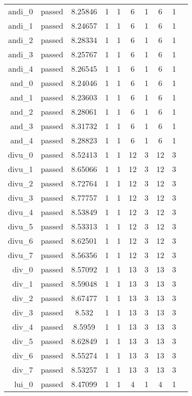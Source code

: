 \begin{longtable}{r|ccccccccc}
    andi\_0 & passed & 8.25846 & 1 & 1 & 6 & 1 & 6 & 1 \\
    andi\_1 & passed & 8.24657 & 1 & 1 & 6 & 1 & 6 & 1 \\
    andi\_2 & passed & 8.28334 & 1 & 1 & 6 & 1 & 6 & 1 \\
    andi\_3 & passed & 8.25767 & 1 & 1 & 6 & 1 & 6 & 1 \\
    andi\_4 & passed & 8.26545 & 1 & 1 & 6 & 1 & 6 & 1 \\
    and\_0 & passed & 8.24046 & 1 & 1 & 6 & 1 & 6 & 1 \\
    and\_1 & passed & 8.23603 & 1 & 1 & 6 & 1 & 6 & 1 \\
    and\_2 & passed & 8.28061 & 1 & 1 & 6 & 1 & 6 & 1 \\
    and\_3 & passed & 8.31732 & 1 & 1 & 6 & 1 & 6 & 1 \\
    and\_4 & passed & 8.28823 & 1 & 1 & 6 & 1 & 6 & 1 \\
    divu\_0 & passed & 8.52413 & 1 & 1 & 12 & 3 & 12 & 3 \\
    divu\_1 & passed & 8.65066 & 1 & 1 & 12 & 3 & 12 & 3 \\
    divu\_2 & passed & 8.72764 & 1 & 1 & 12 & 3 & 12 & 3 \\
    divu\_3 & passed & 8.77757 & 1 & 1 & 12 & 3 & 12 & 3 \\
    divu\_4 & passed & 8.53849 & 1 & 1 & 12 & 3 & 12 & 3 \\
    divu\_5 & passed & 8.53313 & 1 & 1 & 12 & 3 & 12 & 3 \\
    divu\_6 & passed & 8.62501 & 1 & 1 & 12 & 3 & 12 & 3 \\
    divu\_7 & passed & 8.56356 & 1 & 1 & 12 & 3 & 12 & 3 \\
    div\_0 & passed & 8.57092 & 1 & 1 & 13 & 3 & 13 & 3 \\
    div\_1 & passed & 8.59048 & 1 & 1 & 13 & 3 & 13 & 3 \\
    div\_2 & passed & 8.67477 & 1 & 1 & 13 & 3 & 13 & 3 \\
    div\_3 & passed & 8.532 & 1 & 1 & 13 & 3 & 13 & 3 \\
    div\_4 & passed & 8.5959 & 1 & 1 & 13 & 3 & 13 & 3 \\
    div\_5 & passed & 8.62849 & 1 & 1 & 13 & 3 & 13 & 3 \\
    div\_6 & passed & 8.55274 & 1 & 1 & 13 & 3 & 13 & 3 \\
    div\_7 & passed & 8.53257 & 1 & 1 & 13 & 3 & 13 & 3 \\
    lui\_0 & passed & 8.47099 & 1 & 1 & 4 & 1 & 4 & 1 \\

\end{longtable}
